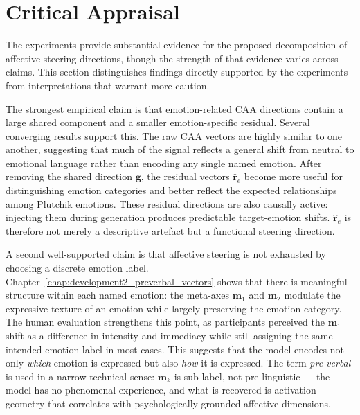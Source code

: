 \section{Critical Appraisal}
\label{sec:eval-appraisal}

The experiments provide substantial evidence for the proposed decomposition of affective steering directions, though the strength of that evidence varies across claims. This section distinguishes findings directly supported by the experiments from interpretations that warrant more caution.\par

The strongest empirical claim is that emotion-related CAA directions contain a large shared component and a smaller emotion-specific residual. Several converging results support this. The raw CAA vectors are highly similar to one another, suggesting that much of the signal reflects a general shift from neutral to emotional language rather than encoding any single named emotion. After removing the shared direction $\mathbf{g}$, the residual vectors $\hat{\mathbf{r}}_e$ become more useful for distinguishing emotion categories and better reflect the expected relationships among Plutchik emotions. These residual directions are also causally active: injecting them during generation produces predictable target-emotion shifts. $\hat{\mathbf{r}}_e$ is therefore not merely a descriptive artefact but a functional steering direction.\par

A second well-supported claim is that affective steering is not exhausted by choosing a discrete emotion label. Chapter~\ref{chap:development2_preverbal_vectors} shows that there is meaningful structure within each named emotion: the meta-axes $\mathbf{m}_1$ and $\mathbf{m}_2$ modulate the expressive texture of an emotion while largely preserving the emotion category. The human evaluation strengthens this point, as participants perceived the $\mathbf{m}_1$ shift as a difference in intensity and immediacy while still assigning the same intended emotion label in most cases. This suggests that the model encodes not only \emph{which} emotion is expressed but also \emph{how} it is expressed. The term \emph{pre-verbal} is used in a narrow technical sense: $\mathbf{m}_k$ is sub-label, not pre-linguistic --- the model has no phenomenal experience, and what is recovered is activation geometry that correlates with psychologically grounded affective dimensions.\par

